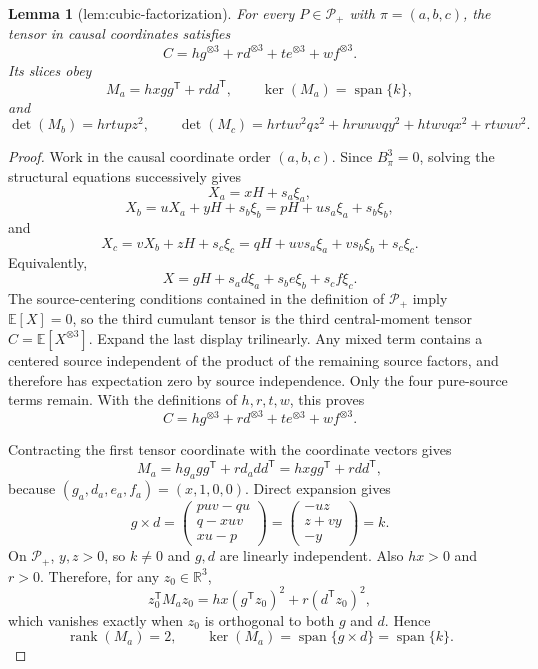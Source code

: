 \documentclass{article}
\newtheorem{lemma}{Lemma}
\begin{document}
\begin{lemma}[lem:cubic-factorization]\label{lem:cubic-factorization}
For every \(P\in\mathcal P_+\) with \(\pi=(a,b,c)\), the tensor in causal coordinates satisfies \[C=hg^{\otimes3}+rd^{\otimes3}+te^{\otimes3}+wf^{\otimes3}.\] Its slices obey \[M_a=hxgg^{\mathsf T}+rdd^{\mathsf T},\qquad \ker(M_a)=\operatorname{span}\{k\},\] and \[\det(M_b)=hrtu p z^2,\qquad \det(M_c)=hrtu v^2qz^2+hrwuvqy^2+htwvqx^2+rtwuv^2.\]
\end{lemma}
\begin{proof}
Work in the causal coordinate order \((a,b,c)\).  Since \(B_\pi^3=0\), solving the structural equations successively gives
\[
X_a=xH+s_a\xi_a,
\]
\[
X_b=uX_a+yH+s_b\xi_b
=pH+us_a\xi_a+s_b\xi_b,
\]
and
\[
X_c=vX_b+zH+s_c\xi_c
=qH+uvs_a\xi_a+vs_b\xi_b+s_c\xi_c.
\]
Equivalently,
\[
X=gH+s_ad\xi_a+s_be\xi_b+s_cf\xi_c.
\]
The source-centering conditions contained in the definition of \(\mathcal P_+\) imply \(\mathbb E[X]=0\), so the third cumulant tensor is the third central-moment tensor \(C=\mathbb E[X^{\otimes3}]\).  Expand the last display trilinearly.  Any mixed term contains a centered source independent of the product of the remaining source factors, and therefore has expectation zero by source independence.  Only the four pure-source terms remain.  With the definitions of \(h,r,t,w\), this proves
\[
C=hg^{\otimes3}+rd^{\otimes3}+te^{\otimes3}+wf^{\otimes3}.
\]

Contracting the first tensor coordinate with the coordinate vectors gives
\[
M_a=h g_a gg^{\mathsf T}+r d_a dd^{\mathsf T}
=hxgg^{\mathsf T}+rdd^{\mathsf T},
\]
because \((g_a,d_a,e_a,f_a)=(x,1,0,0)\).  Direct expansion gives
\[
g\times d
=\begin{pmatrix}puv-qu\\q-xuv\\xu-p\end{pmatrix}
=\begin{pmatrix}-uz\\z+vy\\-y\end{pmatrix}
=k.
\]
On \(\mathcal P_+\), \(y,z>0\), so \(k\ne0\) and \(g,d\) are linearly independent.  Also \(hx>0\) and \(r>0\).  Therefore, for any \(z_0\in\mathbb R^3\),
\[
z_0^{\mathsf T}M_az_0
=hx(g^{\mathsf T}z_0)^2+r(d^{\mathsf T}z_0)^2,
\]
which vanishes exactly when \(z_0\) is orthogonal to both \(g\) and \(d\).  Hence
\[
\operatorname{rank}(M_a)=2,
\qquad
\ker(M_a)=\operatorname{span}\{g\times d\}
=\operatorname{span}\{k\}.
\]


\end{proof}
\end{document}

